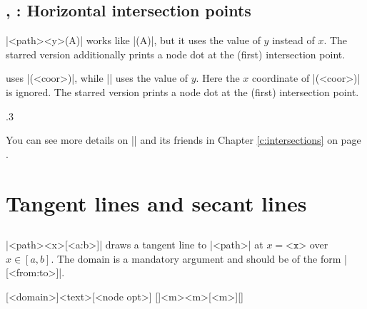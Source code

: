 \subsection{\protect\cmd{\tzhXpointat(*)}, \protect\cmd{\tzhXpoint(*)}: Horizontal intersection points}
\label{ssi:tzhXpoint}

\icmd{\tzhXpointat}|{<path>}{<y>}(A)| works like |(A)|, but it uses the value of $y$ instead of $x$.
The starred version \icmd{\tzhXpointat*} additionally prints a node dot at the (first) intersection point.

\icmd{\tzhXpoint} uses |(<coor>)|, while |\tzhXpointat| uses the value of $y$.
Here the $x$ coordinate of |(<coor>)| is ignored.
The starred version \icmd{\tzhXpoint*} prints a node dot at the (first) intersection point.

\begin{tzcode}{.3}
\end{tzcode}

You can see more details on |\tzXpoint| and its friends in Chapter \ref{c:intersections} on page \pageref{c:intersections}.


\section{Tangent lines and secant lines}
\label{si:tangentlines}

\subsection{\protect\cmd{\tztangentat}}
\label{ssi:tztangentat}

\icmd{\tztangentat}|{<path>}{<x>}[<a:b>]| draws a tangent line to |<path>| at $x=\texttt{<x>}$ over $x\in [a,b]$.
The domain is a mandatory argument and should be of the form |[<from:to>]|.

\begin{tzdef}{}
[<domain>]{<text>}[<node opt>]
  []{<m>}{<m>}[<m>]{}[]
\end{tzdef}


